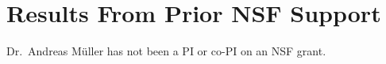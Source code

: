 
\section{Results From Prior NSF Support}
Dr.\ Andreas M\"uller has not been a PI or co-PI on an NSF grant.
